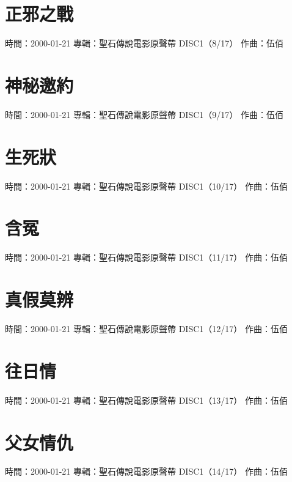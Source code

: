 \documentclass[UTF8,a4paper,oneside,twocolumn,12pt]{ctexbook}
\newcommand{\infopair}[2]{\textbullet #1：#2}
\newcommand{\zq}[1][伍佰]{\infopair{作曲}{#1}}
\newcommand{\zj}[1]{\infopair{專輯}{#1}}
\newcommand{\sj}[1]{\infopair{時間}{#1}}
\newenvironment{info}{\begin{flushleft}\kaishu
	}
	{\end{flushleft}\normalsize\yahei\par}
\begin{document}
\section{正邪之戰}
\begin{info}
	\sj{2000-01-21}
	\zj{聖石傳說電影原聲帶 DISC1（8/17）}
	\zq
\end{info}

\section{神秘邀約}
\begin{info}
	\sj{2000-01-21}
	\zj{聖石傳說電影原聲帶 DISC1（9/17）}
	\zq
\end{info}

\section{生死狀}
\begin{info}
	\sj{2000-01-21}
	\zj{聖石傳說電影原聲帶 DISC1（10/17）}
	\zq
\end{info}

\section{含冤}
\begin{info}
	\sj{2000-01-21}
	\zj{聖石傳說電影原聲帶 DISC1（11/17）}
	\zq
\end{info}

\section{真假莫辨}
\begin{info}
	\sj{2000-01-21}
	\zj{聖石傳說電影原聲帶 DISC1（12/17）}
	\zq
\end{info}

\section{往日情}
\begin{info}
	\sj{2000-01-21}
	\zj{聖石傳說電影原聲帶 DISC1（13/17）}
	\zq
\end{info}

\section{父女情仇}
\begin{info}
	\sj{2000-01-21}
	\zj{聖石傳說電影原聲帶 DISC1（14/17）}
	\zq
\end{info}
\end{document}
